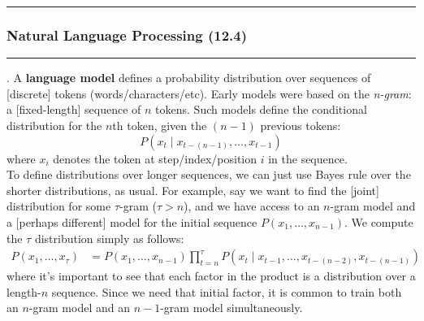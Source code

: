 \documentclass[11pt]{article}
\newcommand\myspace[1][]{\vspace{#1\bigskipamount}}
\newcommand\p{\Needspace{10\baselineskip} \noindent}
\newcommand\tlab[1]{\tag{#1}\label{#1}}
\newcommand\subsub[1]{\Needspace{15\baselineskip}\hrule\subsubsection{#1}\hrule}
\begin{document}

\myspace

\subsub{Natural Language Processing (12.4)}


\myspace
\p {}. A \textbf{language model} defines a probability distribution over sequences of [discrete] tokens (words/characters/etc). Early models were based on the \textit{n-gram}: a [fixed-length] sequence of $n$ tokens. Such models define the conditional distribution for the $n$th token, given the $(n - 1)$ previous tokens: $$P(x_t \mid x_{t - (n - 1)}, \ldots, x_{t - 1})$$where $x_i$ denotes the token at step/index/position $i$ in the sequence. \\

\p To define distributions over longer sequences, we can just use Bayes rule over the shorter distributions, as usual. For example, say we want to find the [joint] distribution for some $\tau$-gram ($\tau > n$), and we have access to an $n$-gram model and a [perhaps different] model for the initial sequence $P(x_1, \ldots, x_{n - 1})$. We compute the $\tau$ distribution simply as follows:
\begin{align}
	P(x_1, \ldots, x_\tau) &= P(x_1, \ldots, x_{n - 1}) \prod_{t = n}^{\tau} 
		P(x_t \mid x_{t - 1}, \ldots, x_{t - (n - 2)}, x_{t - (n - 1)}) \tlab{12.5}
\end{align}
where it's important to see that each factor in the product is a distribution over a length-$n$ sequence. Since we need that initial factor, it is common to train both an $n$-gram model and an $n-1$-gram model simultaneously. \\
\end{document}
